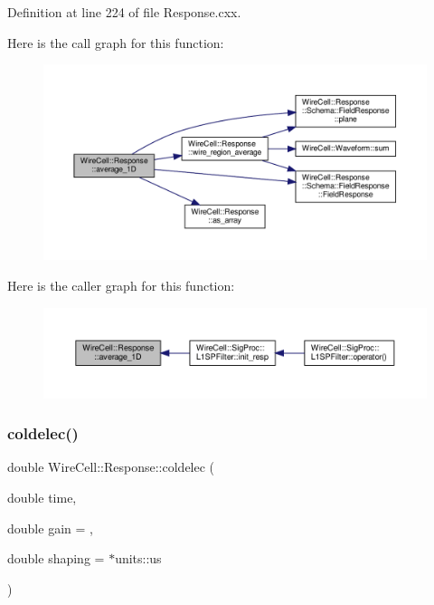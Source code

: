 Definition at line 224 of file Response.\+cxx.

Here is the call graph for this function\+:
\nopagebreak
\begin{figure}[H]
\begin{center}
\leavevmode
\includegraphics[width=350pt]{namespace_wire_cell_1_1_response_a465144cc99feb1c0e2e85c6928ae2506_cgraph}
\end{center}
\end{figure}
Here is the caller graph for this function\+:
\nopagebreak
\begin{figure}[H]
\begin{center}
\leavevmode
\includegraphics[width=350pt]{namespace_wire_cell_1_1_response_a465144cc99feb1c0e2e85c6928ae2506_icgraph}
\end{center}
\end{figure}
\mbox{\label{namespace_wire_cell_1_1_response_a4fc0f118f72199a91582863c978b803c}} 
\subsubsection{\texorpdfstring{coldelec()}{coldelec()}}
{\footnotesize\ttfamily double Wire\+Cell\+::\+Response\+::coldelec (\begin{DoxyParamCaption}\item[{double}]{time,  }\item[{double}]{gain = {},  }\item[{double}]{shaping = {$\ast$units\+:\+:us} }\end{DoxyParamCaption})}



